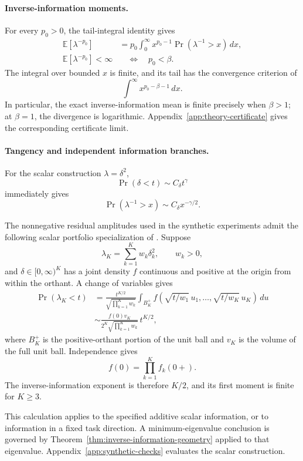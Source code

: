 \paragraph{Inverse-information moments.}

For every \(p_0>0\), the tail-integral identity gives
\[
\begin{aligned}
\mathbb E[\lambda^{-p_0}]
&=
p_0\int_0^\infty
x^{p_0-1}\Pr(\lambda^{-1}>x)\,dx,
\\
\mathbb E[\lambda^{-p_0}]<\infty
&\quad\Longleftrightarrow\quad
p_0<\beta.
\end{aligned}
\tag{A.13}\label{eq:app-inverse-moments}
\]
The integral over bounded \(x\) is finite, and its tail has the convergence criterion of
\[
\int^\infty x^{p_0-\beta-1}\,dx.
\]
In particular, the exact inverse-information mean is finite precisely when \(\beta>1\); at \(\beta=1\), the divergence is logarithmic. Appendix~\ref{app:theory-certificate} gives the corresponding certificate limit.

\paragraph{Tangency and independent information branches.}

For the scalar construction \(\lambda=\delta^2\),
\[
\Pr(\delta<t)\sim C_\delta t^\gamma
\]
immediately gives
\[
\Pr(\lambda^{-1}>x)
\sim
C_\delta x^{-\gamma/2}.
\]

The nonnegative residual amplitudes used in the synthetic experiments admit the following scalar portfolio specialization of \citet{mansouri_arai_2026_fisher_glasses}. Suppose
\[
\lambda_K=\sum_{k=1}^K w_k\delta_k^2,
\qquad w_k>0,
\]
and \(\delta\in[0,\infty)^K\) has a joint density \(f\) continuous and positive at the origin from within the orthant. A change of variables gives
\[
\begin{aligned}
\Pr(\lambda_K<t)
&=
\frac{t^{K/2}}{\sqrt{\prod_{k=1}^K w_k}}
\int_{B_K^+}
f\!\left(
\sqrt{t/w_1}\,u_1,\ldots,
\sqrt{t/w_K}\,u_K
\right)\,du
\\
&\sim
\frac{f(0)v_K}
{2^K\sqrt{\prod_{k=1}^K w_k}}\,
t^{K/2},
\end{aligned}
\tag{A.14}\label{eq:app-independent-branches}
\]
where \(B_K^+\) is the positive-orthant portion of the unit ball and \(v_K\) is the volume of the full unit ball. Independence gives
\[
f(0)=\prod_{k=1}^K f_k(0+).
\]
The inverse-information exponent is therefore \(K/2\), and its first moment is finite for \(K\ge3\).

This calculation applies to the specified additive scalar information, or to information in a fixed task direction. A minimum-eigenvalue conclusion is governed by Theorem~\ref{thm:inverse-information-geometry} applied to that eigenvalue. Appendix~\ref{app:synthetic-checks} evaluates the scalar construction.

